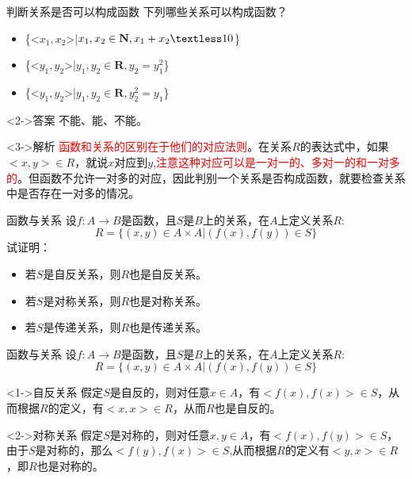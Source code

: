\documentclass[10pt,aspectratio=43,mathserif,table]{beamer}
\begin{document}
\begin{frame}{判断关系是否可以构成函数}
	下列哪些关系可以构成函数？
	\begin{itemize}
		\item<0-> \{<$x_{1},x_{2}$>|$x_{1},x_{2}\in \mathbf{N},x_{1}+x_{2}\textless 10$\}
		\item<0-> \{<$y_{1},y_{2}$>|$y_{1},y_{2}\in \mathbf{R},y_{2}=y_{1}^{2}$\}
		\item<0-> \{<$y_{1},y_{2}$>|$y_{1},y_{2}\in \mathbf{R},y_{2}^{2}=y_{1}$\}
	\end{itemize}

	\begin{block}<2->{答案}
		不能、能、不能。
	\end{block}

	\begin{block}<3->{解析}
		\textcolor{red}{函数和关系的区别在于他们的对应法则}。在关系$R$的表达式中，如果$<x,y>\in R$，就说$x$对应到$y$,\textcolor{red}{注意这种对应可以是一对一的、多对一的和一对多的}。但函数不允许一对多的对应，因此判别一个关系是否构成函数，就要检查关系中是否存在一对多的情况。
	\end{block}
\end{frame}

\begin{frame}{函数与关系}
	设$f:A\rightarrow B$是函数，且$S$是$B$上的关系，在$A$上定义关系$R$:$$R=\{(x,y)\in A\times A|(f(x),f(y))\in S\}$$
	试证明：
	\begin{itemize}
		\item<0-> 若$S$是自反关系，则$R$也是自反关系。
		\item<0-> 若$S$是对称关系，则$R$也是对称关系。
		\item<0-> 若$S$是传递关系，则$R$也是传递关系。
	\end{itemize}
\end{frame}

\begin{frame}{函数与关系}
	设$f:A\rightarrow B$是函数，且$S$是$B$上的关系，在$A$上定义关系$R$:$$R=\{(x,y)\in A\times A|(f(x),f(y))\in S\}$$
	
	\begin{block}<1->{自反关系}
		假定$S$是自反的，则对任意$x\in A$，有$<f(x),f(x)>\in S$，从而根据$R$的定义，有$<x,x>\in R$，从而$R$也是自反的。
	\end{block}
	
	\begin{block}<2->{对称关系}
		假定$S$是对称的，则对任意$x,y\in A$，有$<f(x),f(y)>\in S$，由于$S$是对称的，那么$<f(y),f(x)>\in S$,从而根据$R$的定义有$<y,x>\in R$，即$R$也是对称的。
	\end{block}
	
\end{frame}
\end{document}
